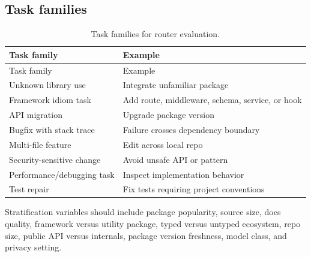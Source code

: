 \documentclass[
  11pt,
  letterpaper,
  numbers=noendperiod,
  parskip=half]{scrartcl}
\begin{document}
\figureEvalLattice

\subsection{Task families}\label{sec-eval-tasks}

\begin{longtable}[]{@{}
  >{\raggedright\arraybackslash}p{}
  >{\raggedright\arraybackslash}p{}@{}}
\caption{Task families for router
evaluation.}\label{tbl-eval-tasks}\tabularnewline
\toprule\noalign{}
\begin{minipage}[b]{\linewidth}\raggedright
Task family
\end{minipage} & \begin{minipage}[b]{\linewidth}\raggedright
Example
\end{minipage} \\
\midrule\noalign{}
\endfirsthead
\toprule\noalign{}
\begin{minipage}[b]{\linewidth}\raggedright
Task family
\end{minipage} & \begin{minipage}[b]{\linewidth}\raggedright
Example
\end{minipage} \\
\midrule\noalign{}
\endhead
\bottomrule\noalign{}
\endlastfoot
Unknown library use & Integrate unfamiliar package \\
Framework idiom task & Add route, middleware, schema, service, or
hook \\
API migration & Upgrade package version \\
Bugfix with stack trace & Failure crosses dependency boundary \\
Multi-file feature & Edit across local repo \\
Security-sensitive change & Avoid unsafe API or pattern \\
Performance/debugging task & Inspect implementation behavior \\
Test repair & Fix tests requiring project conventions \\
\end{longtable}

Stratification variables should include package popularity, source size,
docs quality, framework versus utility package, typed versus untyped
ecosystem, repo size, public API versus internals, package version
freshness, model class, and privacy setting.
\end{document}
